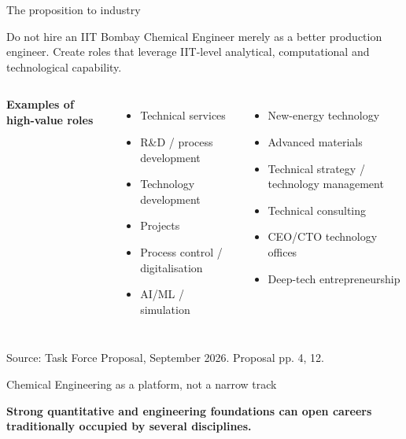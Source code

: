 \documentclass[aspectratio=169,11pt]{beamer}
\newcommand{\key}[1]{\textbf{\color{IITblue}#1}}
\newcommand{\sourcefoot}[1]{\vfill\tiny\color{gray}Source: Task Force Proposal, September 2026. #1}
\begin{document}
\begin{frame}{The proposition to industry}
\begin{block}{Do not hire an IIT Bombay Chemical Engineer merely as a better production engineer.}
Create roles that leverage IIT-level analytical, computational and technological capability.
\end{block}
\vspace{4mm}
\begin{columns}[T]
\textbf{Examples of high-value roles}
\begin{itemize}
\item Technical services
\item R\&D / process development
\item Technology development
\item Projects
\item Process control / digitalisation
\item AI/ML / simulation
\end{itemize}
\begin{itemize}
\item New-energy technology
\item Advanced materials
\item Technical strategy / technology management
\item Technical consulting
\item CEO/CTO technology offices
\item Deep-tech entrepreneurship
\end{itemize}
\end{columns}
\sourcefoot{Proposal pp. 4, 12.}
\end{frame}

\begin{frame}{Chemical Engineering as a platform, not a narrow track}
\begin{center}
\end{center}
\vspace{2mm}
\centering\key{Strong quantitative and engineering foundations can open careers traditionally occupied by several disciplines.}
\end{frame}
\end{document}
